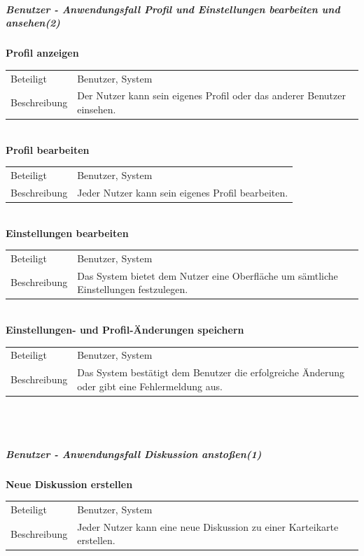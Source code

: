 \documentclass[12pt,a4paper]{article}
\begin{document}
\subparagraph{Benutzer - Anwendungsfall \glqq Profil und Einstellungen bearbeiten und ansehen\grqq  (2)}\mbox{}

\textbf{Profil anzeigen}\\
\begin{tabular}{l|p{12cm}}
\hline 
Beteiligt & Benutzer, System \\ 
Beschreibung & Der Nutzer kann sein eigenes Profil oder das anderer Benutzer einsehen. \\ 
\end{tabular}\\

\textbf{Profil bearbeiten}\\
\begin{tabular}{l|p{12cm}}
\hline 
Beteiligt & Benutzer, System \\ 
Beschreibung & Jeder Nutzer kann sein eigenes Profil bearbeiten. \\ 
\end{tabular}\\ 

\textbf{Einstellungen bearbeiten}\\
\begin{tabular}{l|p{12cm}}
\hline 
Beteiligt & Benutzer, System \\ 
Beschreibung & Das System bietet dem Nutzer eine Oberfläche um sämtliche Einstellungen festzulegen. \\ 
\end{tabular}\\

\textbf{Einstellungen- und Profil-Änderungen speichern}\\
\begin{tabular}{l|p{12cm}}
\hline 
Beteiligt &  Benutzer, System \\ 
Beschreibung & Das System bestätigt dem Benutzer die erfolgreiche Änderung oder gibt eine Fehlermeldung aus. \\ 
\end{tabular}\\\


\subparagraph{Benutzer - Anwendungsfall \glqq Diskussion anstoßen\grqq (1)}\mbox{}

\textbf{Neue Diskussion erstellen}\\
\begin{tabular}{l|p{12cm}}
\hline 
Beteiligt & Benutzer, System \\ 
Beschreibung & Jeder Nutzer kann eine neue Diskussion zu einer Karteikarte erstellen. \\ 
\end{tabular}\\
\end{document}
